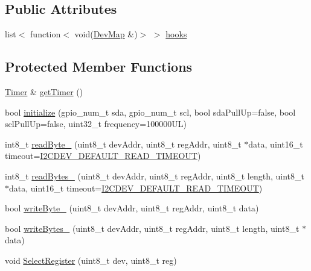\subsection*{Public Attributes}
\begin{DoxyCompactItemize}
\item 
list$<$ function$<$ void(\mbox{\hyperlink{Perif_8hpp_a358ff4ee6d24694ee7661f0cce14377e}{Dev\+Map}} \&)$>$ $>$ \mbox{\hyperlink{classperif_1_1PerifBase_a98964e5ca8384df64881265e0aa6d7b6}{hooks}}
\end{DoxyCompactItemize}
\subsection*{Protected Member Functions}
\begin{DoxyCompactItemize}
\item 
\mbox{\hyperlink{classTimer}{Timer}} \& \mbox{\hyperlink{classperif_1_1Perif_a29c48598a861d85256c30e28af67f864}{get\+Timer}} ()
\item 
bool \mbox{\hyperlink{classI2Cdev_a794a92b925f7970399f8b148caa5eef8}{initialize}} (gpio\+\_\+num\+\_\+t sda, gpio\+\_\+num\+\_\+t scl, bool sda\+Pull\+Up=false, bool scl\+Pull\+Up=false, uint32\+\_\+t frequency=100000\+U\+L)
\item 
int8\+\_\+t \mbox{\hyperlink{classI2Cdev_a74447cfadf4d5054ba29b726afcdecd0}{read\+Byte\+\_\+}} (uint8\+\_\+t dev\+Addr, uint8\+\_\+t reg\+Addr, uint8\+\_\+t $\ast$data, uint16\+\_\+t timeout=\mbox{\hyperlink{I2Cdev_8h_ad9726bb02451bb8f59d3d2729e4cd20e}{I2\+C\+D\+E\+V\+\_\+\+D\+E\+F\+A\+U\+L\+T\+\_\+\+R\+E\+A\+D\+\_\+\+T\+I\+M\+E\+O\+UT}})
\item 
int8\+\_\+t \mbox{\hyperlink{classI2Cdev_a3fae6b1ae9e9398b682eb7bdf6b43561}{read\+Bytes\+\_\+}} (uint8\+\_\+t dev\+Addr, uint8\+\_\+t reg\+Addr, uint8\+\_\+t length, uint8\+\_\+t $\ast$data, uint16\+\_\+t timeout=\mbox{\hyperlink{I2Cdev_8h_ad9726bb02451bb8f59d3d2729e4cd20e}{I2\+C\+D\+E\+V\+\_\+\+D\+E\+F\+A\+U\+L\+T\+\_\+\+R\+E\+A\+D\+\_\+\+T\+I\+M\+E\+O\+UT}})
\item 
bool \mbox{\hyperlink{classI2Cdev_a97645c5d6a3e295bb72b9ee5ab810d12}{write\+Byte\+\_\+}} (uint8\+\_\+t dev\+Addr, uint8\+\_\+t reg\+Addr, uint8\+\_\+t data)
\item 
bool \mbox{\hyperlink{classI2Cdev_a2f9176cd44c3163ca3929ac1c2ff601b}{write\+Bytes\+\_\+}} (uint8\+\_\+t dev\+Addr, uint8\+\_\+t reg\+Addr, uint8\+\_\+t length, uint8\+\_\+t $\ast$data)
\item 
void \mbox{\hyperlink{classI2Cdev_a3be31bf7d3f40bb215d8854aac945db3}{Select\+Register}} (uint8\+\_\+t dev, uint8\+\_\+t reg)

\end{DoxyCompactItemize}
